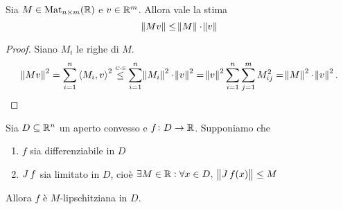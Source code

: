 \begin{prop}
	Sia $ M \in \mathrm{Mat}_{n \times m}(\mathbb{R}) $ e $ v \in \mathbb{R}^m $. Allora vale la stima
	\[ \norm{Mv} \leq \norm{M} \cdot \norm{v} \]
\end{prop}
\begin{proof}
	Siano $ M_i $ le righe di $ M $. 
	\[ 
	\norm{Mv}^2 = \sum_{i=1}^{n} \left\langle M_i, v \right\rangle^2 \overset{\text{\tiny C-S}}{\leq} \sum_{i=1}^{n} \norm{M_i}^2 \cdot \norm{v}^2
	    = \norm{v}^2 \sum_{i=1}^{n} \sum_{j=1}^{m} M_{ij}^2 = \norm{M}^2 \cdot \norm{v}^2. \qedhere 
	\]
\end{proof}

\begin{prop}
	Sia $ D \subseteq \mathbb{R}^n $ un aperto convesso e $ f \colon D \to \mathbb{R} $.  Supponiamo che 
	\begin{enumerate}[label = (\roman*)]
		\item $ f $ sia differenziabile in $ D $
		\item $ \operatorname{\mathit{J}}{f} $ sia limitato in $ D $, cioè $ \exists M \in \R : \forall x \in D, \ \norm{\jac{f}(x)} \leq M $
	\end{enumerate}
	Allora $ f $ è $ M $-lipschitziana in $ D $.
\end{prop}

